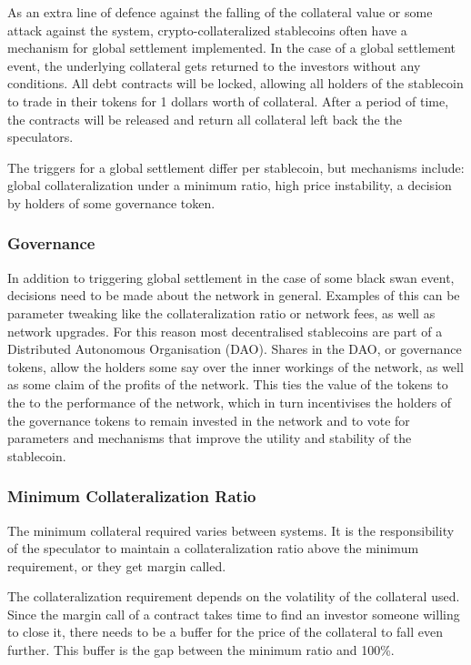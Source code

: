 \documentclass[english,]{IEEEtran}
\begin{document}
As an extra line of defence against the falling of the collateral value
or some attack against the system, crypto-collateralized stablecoins
often have a mechanism for global settlement implemented. In the case of
a global settlement event, the underlying collateral gets returned to
the investors without any conditions. All debt contracts will be locked,
allowing all holders of the stablecoin to trade in their tokens for 1
dollars worth of collateral. After a period of time, the contracts will
be released and return all collateral left back the the speculators.

The triggers for a global settlement differ per stablecoin, but
mechanisms include: global collateralization under a minimum ratio, high
price instability, a decision by holders of some governance token.

\subsubsection{Governance}\label{governance}

In addition to triggering global settlement in the case of some black
swan event, decisions need to be made about the network in general.
Examples of this can be parameter tweaking like the collateralization
ratio or network fees, as well as network upgrades. For this reason most
decentralised stablecoins are part of a Distributed Autonomous
Organisation (DAO). Shares in the DAO, or governance tokens, allow the
holders some say over the inner workings of the network, as well as some
claim of the profits of the network. This ties the value of the tokens
to the to the performance of the network, which in turn incentivises the
holders of the governance tokens to remain invested in the network and
to vote for parameters and mechanisms that improve the utility and
stability of the stablecoin.

\subsubsection{Minimum Collateralization
Ratio}\label{minimum-collateralization-ratio}

The minimum collateral required varies between systems. It is the
responsibility of the speculator to maintain a collateralization ratio
above the minimum requirement, or they get margin called.

The collateralization requirement depends on the volatility of the
collateral used. Since the margin call of a contract takes time to find
an investor someone willing to close it, there needs to be a buffer for
the price of the collateral to fall even further. This buffer is the gap
between the minimum ratio and 100\%.
\end{document}
